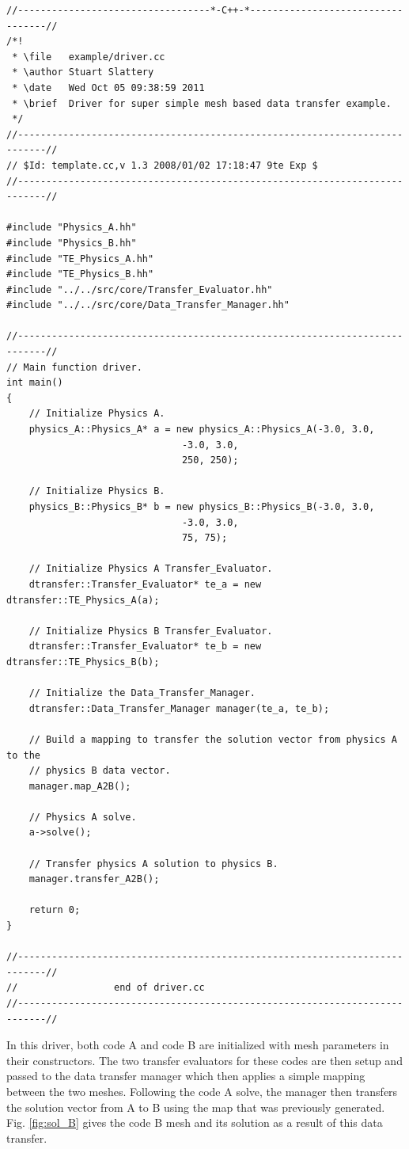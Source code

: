 \documentclass[letterpaper]{article}
\begin{document}
\begin{lstlisting}
//----------------------------------*-C++-*----------------------------------//
/*!
 * \file   example/driver.cc
 * \author Stuart Slattery
 * \date   Wed Oct 05 09:38:59 2011
 * \brief  Driver for super simple mesh based data transfer example.
 */
//---------------------------------------------------------------------------//
// $Id: template.cc,v 1.3 2008/01/02 17:18:47 9te Exp $
//---------------------------------------------------------------------------//

#include "Physics_A.hh"
#include "Physics_B.hh"
#include "TE_Physics_A.hh"
#include "TE_Physics_B.hh"
#include "../../src/core/Transfer_Evaluator.hh"
#include "../../src/core/Data_Transfer_Manager.hh"

//---------------------------------------------------------------------------//
// Main function driver.
int main()
{
    // Initialize Physics A.
    physics_A::Physics_A* a = new physics_A::Physics_A(-3.0, 3.0,
						       -3.0, 3.0,
						       250, 250);

    // Initialize Physics B.
    physics_B::Physics_B* b = new physics_B::Physics_B(-3.0, 3.0,
						       -3.0, 3.0,
						       75, 75);

    // Initialize Physics A Transfer_Evaluator.
    dtransfer::Transfer_Evaluator* te_a = new dtransfer::TE_Physics_A(a);

    // Initialize Physics B Transfer_Evaluator.
    dtransfer::Transfer_Evaluator* te_b = new dtransfer::TE_Physics_B(b);

    // Initialize the Data_Transfer_Manager.
    dtransfer::Data_Transfer_Manager manager(te_a, te_b);

    // Build a mapping to transfer the solution vector from physics A to the
    // physics B data vector.
    manager.map_A2B();

    // Physics A solve.
    a->solve();

    // Transfer physics A solution to physics B.
    manager.transfer_A2B();

    return 0;
}

//---------------------------------------------------------------------------//
//                 end of driver.cc
//---------------------------------------------------------------------------//
\end{lstlisting}

In this driver, both code A and code B are initialized with mesh
parameters in their constructors. The two transfer evaluators for
these codes are then setup and passed to the data transfer
manager which then applies a simple mapping between the two
meshes. Following the code A solve, the manager then transfers the
solution vector from A to B using the map that was previously
generated. Fig. \ref{fig:sol_B} gives the code B mesh and its solution
as a result of this data transfer.
\end{document}
